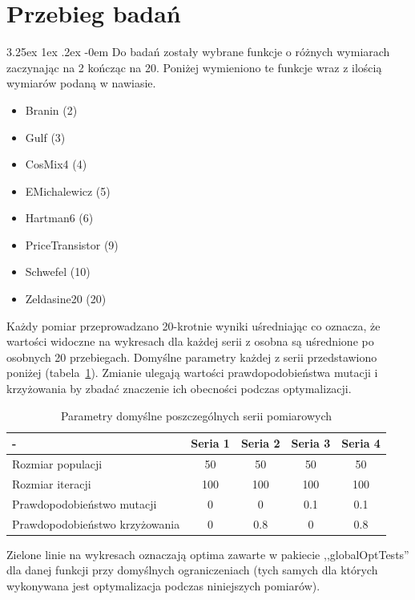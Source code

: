 \documentclass[11pt, a4paper]{article}
\makeatletter
\newcommand{\fbi}{\leavevmode{\parindent=1em\indent}}
\renewcommand\paragraph{\@startsection{paragraph}{5}{\z@}
  {3.25ex \@plus1ex \@minus.2ex}
  {-0em}
  {\normalfont\normalsize\bfseries}}
\makeatother
\begin{document}
\newpage
\section{Przebieg badań}
\paragraph{}
Do badań zostały wybrane funkcje o różnych wymiarach zaczynając na 2 kończąc na 20. Poniżej wymieniono te funkcje wraz z ilością wymiarów podaną w nawiasie.

\begin{itemize}
	\item Branin (2)
	\item Gulf (3)
	\item CosMix4 (4)
	\item EMichalewicz (5)
	\item Hartman6 (6)
	\item PriceTransistor (9)
	\item Schwefel (10)
	\item Zeldasine20 (20)
\end{itemize}

\fbi
Każdy pomiar przeprowadzano 20-krotnie wyniki uśredniając co oznacza, że wartości widoczne na wykresach dla każdej serii z osobna są uśrednione po osobnych 20 przebiegach. Domyślne parametry każdej z serii przedstawiono poniżej (tabela~\ref{tab:parametry}). Zmianie ulegają wartości  prawdopodobieństwa mutacji i krzyżowania by zbadać znaczenie ich obecności podczas optymalizacji.

\begin{table}[htbp]
	\centering
	\caption{Parametry domyślne poszczególnych serii pomiarowych}
	\label{tab:parametry}
	\begin{tabularx}{\textwidth}{|X|c|c|c|c|}
		\hline
		- & Seria 1 & Seria 2 & Seria 3 & Seria 4\\ 
		\hline
		Rozmiar populacji & 50 & 50 & 50 & 50 \\ 
		\hline 
		Rozmiar iteracji & 100 & 100 & 100 & 100 \\ 
		\hline 
		Prawdopodobieństwo mutacji & 0 & 0 & 0.1 & 0.1 \\ 
		\hline 
		Prawdopodobieństwo krzyżowania & 0 & 0.8 & 0 & 0.8 \\ 
		\hline 
	\end{tabularx} 
\end{table}

\fbi
Zielone linie na wykresach oznaczają optima zawarte w pakiecie ,,globalOptTests'' dla danej funkcji przy domyślnych ograniczeniach (tych samych dla których wykonywana jest optymalizacja podczas niniejszych pomiarów).
\end{document}
